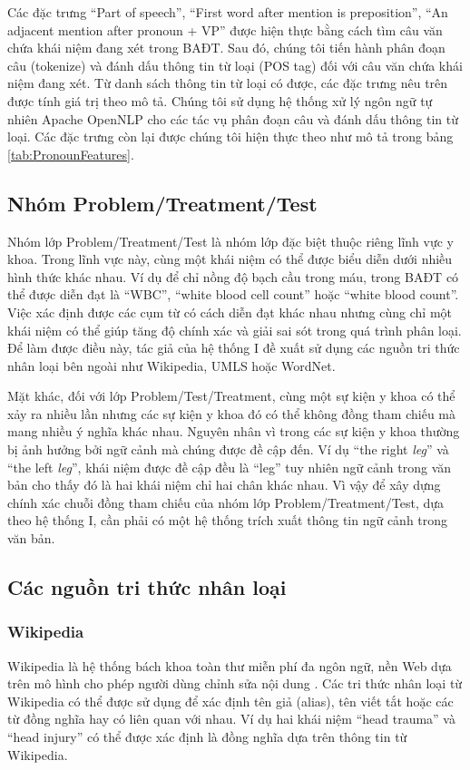 Các đặc trưng ``Part of speech'', ``First word after mention is preposition'', ``An adjacent mention after pronoun + VP'' được hiện thực bằng cách tìm câu văn chứa khái niệm đang xét trong BAĐT. Sau đó, chúng tôi tiến hành phân đoạn câu (tokenize) và đánh dấu thông tin từ loại (POS tag)\cite{treebank} đối với câu văn chứa khái niệm đang xét. Từ danh sách thông tin từ loại có được, các đặc trưng nêu trên được tính giá trị theo mô tả. Chúng tôi sử dụng hệ thống xử lý ngôn ngữ tự nhiên Apache OpenNLP cho các tác vụ phân đoạn câu và đánh dấu thông tin từ loại. Các đặc trưng còn lại được chúng tôi hiện thực theo như mô tả trong bảng \ref{tab:PronounFeatures}.

\subsection*{Nhóm Problem/Treatment/Test}
Nhóm lớp Problem/Treatment/Test là nhóm lớp đặc biệt thuộc riêng lĩnh vực y khoa. Trong lĩnh vực này, cùng một khái niệm có thể được biểu diễn dưới nhiều hình thức khác nhau. Ví dụ để chỉ nồng độ bạch cầu trong máu, trong BAĐT có thể được diễn đạt là ``WBC'', ``white blood cell count'' hoặc ``white blood count''. Việc xác định được các cụm từ có cách diễn đạt khác nhau nhưng cùng chỉ một khái niệm có thể giúp tăng độ chính xác và giải sai sót trong quá trình phân loại. Để làm được điều này, tác giả của hệ thống I đề xuất sử dụng các nguồn tri thức nhân loại bên ngoài như Wikipedia, UMLS hoặc WordNet.

Mặt khác, đối với lớp Problem/Test/Treatment, cùng một sự kiện y khoa có thể xảy ra nhiều lần nhưng các sự kiện y khoa đó có thể không đồng tham chiếu mà mang nhiều ý nghĩa khác nhau. Nguyên nhân vì trong các sự kiện y khoa thường bị ảnh hưởng bởi ngữ cảnh mà chúng được đề cập đến. Ví dụ ``the right \textit{leg}'' và ``the left \textit{leg}'', khái niệm được đề cập đều là ``leg'' tuy nhiên ngữ cảnh trong văn bản cho thấy đó là hai khái niệm chỉ hai chân khác nhau. Vì vậy để xây dựng chính xác chuỗi đồng tham chiếu của nhóm lớp Problem/Treatment/Test, dựa theo hệ thống I, cần phải có một hệ thống trích xuất thông tin ngữ cảnh trong văn bản.

\subsection*{Các nguồn tri thức nhân loại}

\subsubsection*{Wikipedia}
Wikipedia là hệ thống bách khoa toàn thư miễn phí đa ngôn ngữ, nền Web dựa trên mô hình cho phép người dùng chỉnh sửa nội dung \cite{wikipediaabout}. Các tri thức nhân loại từ Wikipedia có thể được sử dụng để xác định tên giả (alias), tên viết tắt hoặc các từ đồng nghĩa hay có liên quan với nhau. Ví dụ hai khái niệm ``head trauma'' và ``head injury'' có thể được xác định là đồng nghĩa dựa trên thông tin từ Wikipedia.

